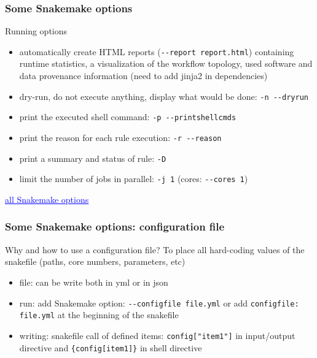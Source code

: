 \begin{frame}[containsverbatim]
\frametitle{Some Snakemake options}
\begin{block}{Running options}
\begin{itemize}
    \item automatically create HTML reports (\verb|--report report.html|) containing runtime statistics, a visualization of the workflow topology, used software and data provenance information (need to add jinja2 in dependencies)
    \item dry-run, do not execute anything, display what would be done: \verb|-n --dryrun|
    \item print the executed shell command: \verb|-p --printshellcmds |
    \item print the reason for each rule execution: \verb|-r --reason|
    \item print a summary and status of rule: \verb|-D|
    \item limit the number of jobs in parallel: \verb|-j 1| (cores: \verb|--cores 1|)
\end{itemize}
\end{block}
\vfill
\href{https://snakemake.readthedocs.io/en/stable/executing/cli.html#all-option}{\textcolor{blue}{\underline{all Snakemake options}}}
\end{frame}
\begin{frame}[containsverbatim]
\frametitle{Some Snakemake options: configuration file}
\begin{block}{Why and how to use a configuration file?}
To place all hard-coding values of the snakefile (paths, core numbers, parameters, etc)
\begin{itemize}
    \item file: can be write both in yml or in json
    \item run: add Snakemake option: \verb|--configfile file.yml| or add \verb|configfile: file.yml| at the beginning of the snakefile
    \item writing: snakefile call of defined items: \verb|config["item1"]| in input/output directive and \verb|{config[item1]}| in shell directive
\end{itemize}
\end{block}
\end{frame}
